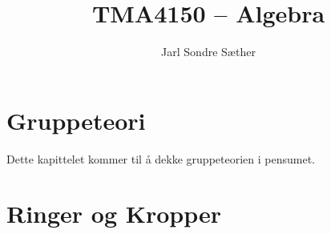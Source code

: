 \documentclass{book}
\title{TMA4150 – Algebra}
\author{Jarl Sondre Sæther}
\date{}
\begin{document}
\maketitle

\newpage
\tableofcontents

\chapter{Gruppeteori}
Dette kapittelet kommer til å dekke gruppeteorien i pensumet.













\chapter{Ringer og Kropper}







\end{document}
